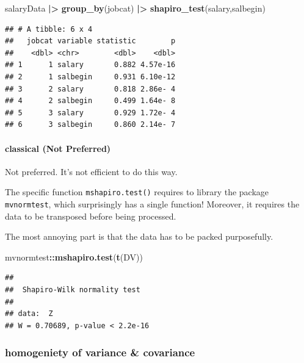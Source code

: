 \documentclass[
]{ctexart}
\newenvironment{Shaded}{\begin{snugshade}}{\end{snugshade}}
\newcommand{\FunctionTok}[1]{\textcolor[rgb]{0.13,0.29,0.53}{\textbf{#1}}}
\newcommand{\NormalTok}[1]{#1}
\newcommand{\SpecialCharTok}[1]{\textcolor[rgb]{0.81,0.36,0.00}{\textbf{#1}}}
\begin{document}
\begin{Shaded}
\begin{Highlighting}[]
\NormalTok{salaryData }\SpecialCharTok{|\textgreater{}} \FunctionTok{group\_by}\NormalTok{(jobcat) }\SpecialCharTok{|\textgreater{}} 
  \FunctionTok{shapiro\_test}\NormalTok{(salary,salbegin)}
\end{Highlighting}
\end{Shaded}

\begin{verbatim}
## # A tibble: 6 x 4
##   jobcat variable statistic        p
##    <dbl> <chr>        <dbl>    <dbl>
## 1      1 salary       0.882 4.57e-16
## 2      1 salbegin     0.931 6.10e-12
## 3      2 salary       0.818 2.86e- 4
## 4      2 salbegin     0.499 1.64e- 8
## 5      3 salary       0.929 1.72e- 4
## 6      3 salbegin     0.860 2.14e- 7
\end{verbatim}

\hypertarget{classical-not-preferred}{%
\paragraph{classical (Not Preferred)}\label{classical-not-preferred}}

Not preferred. It's not efficient to do this way.

The specific function \texttt{mshapiro.test()} requires to library the
package \texttt{mvnormtest}, which surprisingly has a single function!
Moreover, it requires the data to be transposed before being processed.

The most annoying part is that the data has to be packed purposefully.

\begin{Shaded}
\begin{Highlighting}[]
\NormalTok{mvnormtest}\SpecialCharTok{::}\FunctionTok{mshapiro.test}\NormalTok{(}\FunctionTok{t}\NormalTok{(DV))}
\end{Highlighting}
\end{Shaded}

\begin{verbatim}
## 
##  Shapiro-Wilk normality test
## 
## data:  Z
## W = 0.70689, p-value < 2.2e-16
\end{verbatim}

\hypertarget{homogeniety-of-variance-covariance}{%
\subsubsection{homogeniety of variance \&
covariance}\label{homogeniety-of-variance-covariance}}
\end{document}
